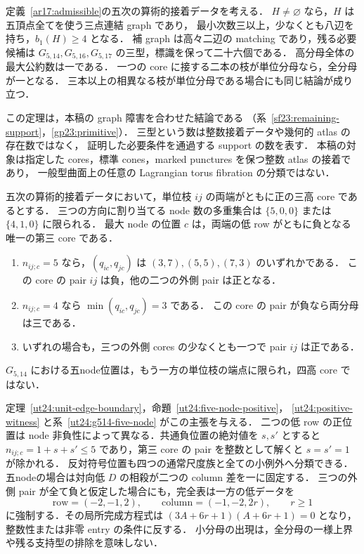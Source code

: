 \begin{theorem}
\label{ar17:main-support}
定義~\ref{ar17:admissible}の五次の算術的接着データを考える．
$H\ne\varnothing$ なら，$H$ は五頂点全てを使う三点連結 graph であり，
最小次数三以上，少なくとも八辺を持ち，$b_1(H)\ge4$ となる．
補 graph は高々二辺の matching であり，残る必要候補は
$G_{5,14},G_{5,16},G_{5,17}$ の三型，標識を保って二十六個である．
高分母全体の最大公約数は一である．
一つの core に接する二本の枝が単位分母なら，全分母が一となる．
三本以上の相異なる枝が単位分母である場合にも同じ結論が成り立つ．
\end{theorem}

この定理は，本稿の graph 障害を合わせた結論である
（系~\ref{sf23:remaining-support}，\ref{gp23:primitive}）．
三型という数は整数接着データや幾何的 atlas の存在数ではなく，
証明した必要条件を通過する support の数を表す．
本稿の対象は指定した cores，標準 cones，marked punctures を保つ整数 atlas の接着であり，
一般型曲面上の任意の Lagrangian torus fibration の分類ではない．

\begin{theorem}
\label{ar24:unit-edge-boundary}
五次の算術的接着データにおいて，単位枝 $ij$ の両端がともに正の三高 core であるとする．
三つの方向に割り当てる node 数の多重集合は $\{5,0,0\}$ または $\{4,1,0\}$ に限られる．
最大 node の位置 $c$ は，両端の低 row がともに負となる唯一の第三 core である．
\begin{enumerate}
\item $n_{ij;c}=5$ なら，$(q_{ic},q_{jc})$ は $(3,7),(5,5),(7,3)$ のいずれかである．
この core の pair $ij$ は負，他の二つの外側 pair は正となる．
\item $n_{ij;c}=4$ なら $\min(q_{ic},q_{jc})=3$ である．
この core の pair が負なら両分母は三である．
\item いずれの場合も，三つの外側 cores の少なくとも一つで pair $ij$ は正である．
\end{enumerate}
$G_{5,14}$ における五node位置は，もう一方の単位枝の端点に限られ，四高 core ではない．
\end{theorem}

定理~\ref{ut24:unit-edge-boundary}，命題~\ref{ut24:five-node-positive}，
\ref{ut24:positive-witness} と系~\ref{ut24:g514-five-node} がこの主張を与える．
二つの低 row の正位置は node 非負性によって異なる．共通負位置の絶対値を $s,s'$ とすると
$n_{ij;c}=1+s+s'\le5$ であり，第三 core の pair を整数として解くと $s=s'=1$ が除かれる．
反対符号位置も四つの通常尺度族と全ての小例外へ分類できる．
五nodeの場合は対向低 $D$ の相殺が二つの column 差を一に固定する．
三つの外側 pair が全て負と仮定した場合にも，完全表は一方の低データを
\[
 \text{row}=(-2,-1,2),\qquad \text{column}=(-1,-2,2r),\qquad r\ge1
\]
に強制する．その局所完成方程式は
$(3A+6r+1)(A+6r+1)=0$ となり，整数性または非零 entry の条件に反する．
小分母の出現は，全分母の一様上界や残る支持型の排除を意味しない．

